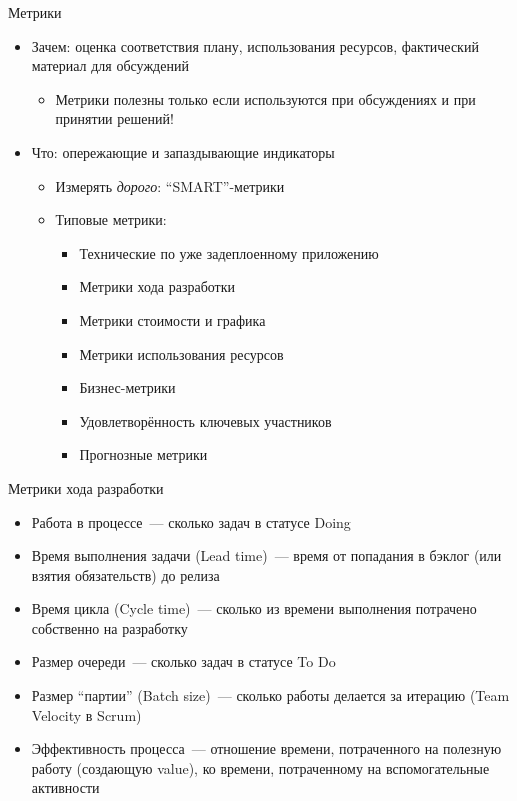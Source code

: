 \documentclass{../../slides-style}
\begin{document}
    \begin{frame}{Метрики}
        \begin{itemize}
            \item Зачем: оценка соответствия плану, использования ресурсов, фактический материал для обсуждений
            \begin{itemize}
                \item Метрики полезны только если используются при обсуждениях и при принятии решений!
            \end{itemize}
            \item Что: опережающие и запаздывающие индикаторы
            \begin{itemize}
                \item Измерять \emph{дорого}: \enquote{SMART}-метрики
                \item Типовые метрики: 
                \begin{itemize}
                    \item Технические по уже задеплоенному приложению
                    \item Метрики хода разработки
                    \item Метрики стоимости и графика
                    \item Метрики использования ресурсов
                    \item Бизнес-метрики
                    \item Удовлетворённость ключевых участников
                    \item Прогнозные метрики
                \end{itemize}
            \end{itemize}
        \end{itemize}
    \end{frame}

    \begin{frame}{Метрики хода разработки}
        \begin{itemize}
            \item Работа в процессе~--- сколько задач в статусе Doing
            \item Время выполнения задачи (Lead time)~--- время от попадания в бэклог (или взятия обязательств) до релиза
            \item Время цикла (Cycle time)~--- сколько из времени выполнения потрачено собственно на разработку
            \item Размер очереди~--- сколько задач в статусе To Do
            \item Размер \enquote{партии} (Batch size)~--- сколько работы делается за итерацию (Team Velocity в Scrum)
            \item Эффективность процесса~--- отношение времени, потраченного на полезную работу (создающую value), ко времени, потраченному на вспомогательные активности
        \end{itemize}
    \end{frame}
\end{document}

